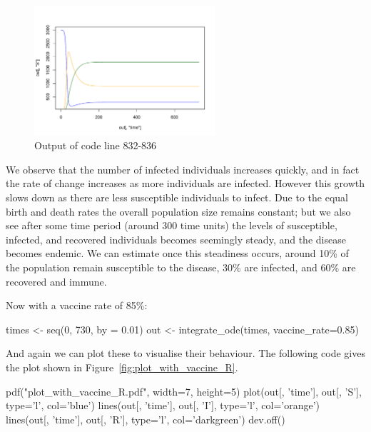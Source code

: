 \begin{figure}
\begin{center}
\includegraphics[width=0.6\textwidth]{./assets/plot_no_vaccine_R.pdf}
\end{center}
\caption{Output of code line 832-836}
\label{fig:plot_no_vaccine_R}
\end{figure}

We observe that the number of infected individuals increases quickly, and in
fact the rate of change increases as more individuals are infected. However
this growth slows down as there are less susceptible individuals to infect. Due
to the equal birth and death rates the overall population size remains constant;
but we also see after some time period (around 300 time units) the levels of
susceptible, infected, and recovered individuals becomes seemingly steady, and
the disease becomes endemic. We can estimate once this steadiness occurs, around
10\% of the population remain susceptible to the disease, 30\% are infected, and
60\% are recovered and immune.

Now with a vaccine rate of 85\%:

\begin{Rin}
times <- seq(0, 730, by = 0.01)
out <- integrate_ode(times, vaccine_rate=0.85)
\end{Rin}

And again we can plot these to visualise their behaviour. The following code
gives the plot shown in Figure~\ref{fig:plot_with_vaccine_R}.

\begin{Rin}
pdf("plot_with_vaccine_R.pdf", width=7, height=5) 
plot(out[, 'time'], out[, 'S'], type='l', col='blue')
lines(out[, 'time'], out[, 'I'], type='l', col='orange')
lines(out[, 'time'], out[, 'R'], type='l', col='darkgreen')
dev.off()
\end{Rin}


